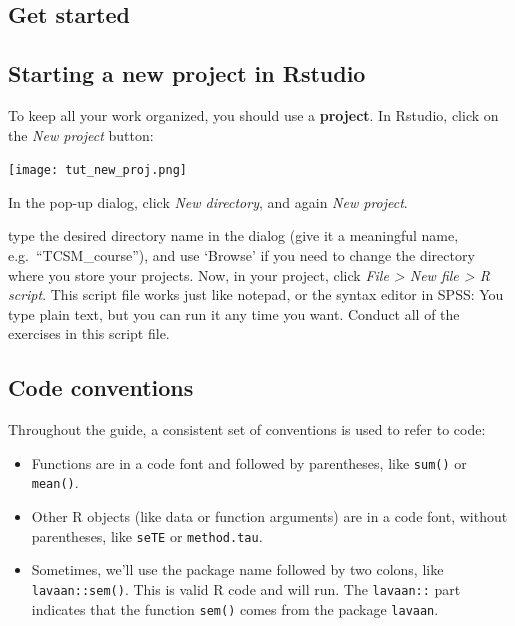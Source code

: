 \documentclass[
]{book}
\providecommand{\tightlist}{%
  \setlength{\itemsep}{0pt}\setlength{\parskip}{0pt}}
\begin{document}
\hypertarget{get-started}{%
\subsection{Get started}\label{get-started}}

\hypertarget{starting-a-new-project-in-rstudio}{%
\subsection{Starting a new project in Rstudio}\label{starting-a-new-project-in-rstudio}}

To keep all your work organized, you should use a \textbf{project}. In Rstudio, click on the \emph{New project} button:

\texttt{[image: tut\_new\_proj.png]}

In the pop-up dialog, click \emph{New directory}, and again \emph{New project}.

type the desired directory name in the dialog (give it a meaningful name, e.g.~``TCSM\_course''), and use `Browse' if you need to change the directory where you store your projects. Now, in your project, click \emph{File \textgreater{} New file \textgreater{} R script}. This script file works just like notepad, or the syntax editor in SPSS: You type plain text, but you can run it any time you want. Conduct all of the exercises in this script file.

\hypertarget{code-conventions}{%
\subsection{Code conventions}\label{code-conventions}}

Throughout the guide, a consistent set of conventions is used to refer to code:

\begin{itemize}
\tightlist
\item
  Functions are in a code font and followed by parentheses, like
  \texttt{sum()} or \texttt{mean()}.
\item
  Other R objects (like data or function arguments) are in a code
  font, without parentheses, like \texttt{seTE} or \texttt{method.tau}.
\item
  Sometimes, we'll use the package name followed by two colons, like
  \texttt{lavaan::sem()}. This is valid R code and will run. The \texttt{lavaan::} part indicates that the function \texttt{sem()} comes from the package \texttt{lavaan}.
\end{itemize}
\end{document}
